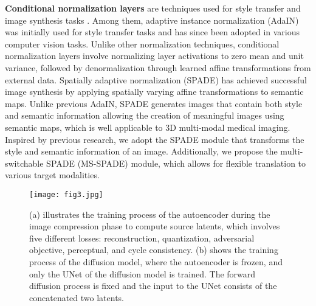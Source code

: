 \documentclass[10pt,twocolumn,letterpaper]{article}
\begin{document}
\noindent \textbf{Conditional normalization layers} are techniques used for style transfer and image synthesis tasks \cite{dumoulin2016learned, huang2017arbitrary, perez2018film, park2019semantic}. Among them, adaptive instance normalization (AdaIN) \cite{huang2017arbitrary} was initially used for style transfer tasks and has since been adopted in various computer vision tasks. Unlike other normalization techniques, conditional normalization layers involve normalizing layer activations to zero mean and unit variance, followed by denormalization through learned affine transformations from external data.
Spatially adaptive normalization (SPADE) \cite{park2019semantic} has achieved successful image synthesis by applying spatially varying affine transformations to semantic maps. Unlike previous AdaIN, SPADE generates images that contain both style and semantic information allowing the creation of meaningful images using semantic maps, which is well applicable to 3D multi-modal medical imaging. Inspired by previous research, we adopt the SPADE module that transforms the style and semantic information of an image. Additionally, we propose the multi-switchable SPADE (MS-SPADE) module, which allows for flexible translation to various target modalities.

\begin{figure*} [ht]
    \texttt{[image: fig3.jpg]}
    \vspace{-12pt}
    \caption{(a) illustrates the training process of the autoencoder during the image compression phase to compute source latents, which involves five different losses: reconstruction, quantization, adversarial objective, perceptual, and cycle consistency. (b) shows the training process of the diffusion model, where the autoencoder is frozen, and only the UNet of the diffusion model is trained. The forward diffusion process is fixed and the input to the UNet consists of the concatenated two latents.} 
    \label{fig3}
    \vspace{-10pt}
\end{figure*}
\end{document}
